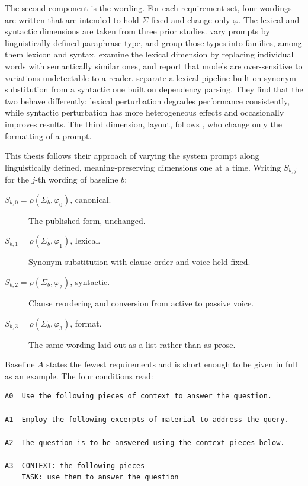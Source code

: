 \documentclass[12pt,a4paper,oneside]{scrreprt}
\begin{document}
The second component is the wording. For each requirement set, four wordings are written that are intended to hold $\Sigma$ fixed and change only $\varphi$. The lexical and syntactic dimensions are taken from three prior studies. \citet{wahle2024paraphrase} vary prompts by linguistically defined paraphrase type, and group those types into families, among them lexicon and syntax. \citet{zhan2024lexical} examine the lexical dimension by replacing individual words with semantically similar ones, and report that models are over-sensitive to variations undetectable to a reader. \citet{kostic2026samemeaning} separate a lexical pipeline built on synonym substitution from a syntactic one built on dependency parsing. They find that the two behave differently: lexical perturbation degrades performance consistently, while syntactic perturbation has more heterogeneous effects and occasionally improves results. The third dimension, layout, follows \citet{sclar2024quantifying}, who change only the formatting of a prompt.

This thesis follows their approach of varying the system prompt along linguistically defined, meaning-preserving dimensions one at a time. Writing $S_{b,j}$ for the $j$-th wording of baseline $b$:
\begin{description}
    \item[$S_{b,0} = \rho(\Sigma_b,\varphi_0)$, canonical.] The published form, unchanged.
    \item[$S_{b,1} = \rho(\Sigma_b,\varphi_1)$, lexical.] Synonym substitution with clause order and voice held fixed.
    \item[$S_{b,2} = \rho(\Sigma_b,\varphi_2)$, syntactic.] Clause reordering and conversion from active to passive voice.
    \item[$S_{b,3} = \rho(\Sigma_b,\varphi_3)$, format.] The same wording laid out as a list rather than as prose.

\end{description}

Baseline $A$ states the fewest requirements and is short enough to be given in full as an example. The four conditions read:

\begin{lstlisting}[style=promptbox,caption={The four conditions of baseline $A$ from \citet{friel2024ragbench}.},label={lst:baselineA}]
A0  Use the following pieces of context to answer the question.

A1  Employ the following excerpts of material to address the query.

A2  The question is to be answered using the context pieces below.

A3  CONTEXT: the following pieces
    TASK: use them to answer the question
\end{lstlisting}
\end{document}

